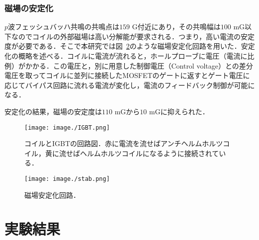 \documentclass[11pt,a4j,notitlepage]{jreport}
\newcommand{\fig}[1]{図~\ref{#1}}	%
\begin{document}
\subsection{磁場の安定化}
$p$波フェッシュバッハ共鳴の共鳴点は$159$ G付近にあり，その共鳴幅は$100$ mG以下なのでコイルの外部磁場は高い分解能が要求される．つまり，高い電流の安定度が必要である．そこで本研究では\fig{fig3.4.2}のような磁場安定化回路を用いた．安定化の概略を述べる．コイルに電流が流れると，ホールプローブに電圧（電流に比例）がかかる．この電圧と，別に用意した制御電圧（Control voltage）との差分電圧を取ってコイルに並列に接続したMOSFETのゲートに返すとゲート電圧に応じてバイパス回路に流れる電流が変化し，電流のフィードバック制御が可能になる．

安定化の結果，磁場の安定度は$110$ mGから$10$ mGに抑えられた．
\begin{figure}[H]
	\centering
		\texttt{[image: image./IGBT.png]}
	\caption{コイルとIGBTの回路図．赤に電流を流せばアンチヘルムホルツコイル，黄に流せばヘルムホルツコイルになるように接続されている．}
	\label{fig3.4.1}
\end{figure}

\begin{figure}[H]
	\centering
		\texttt{[image: image./stab.png]}
	\caption{磁場安定化回路．}
	\label{fig3.4.2}
\end{figure}

\chapter{実験結果}
\end{document}
